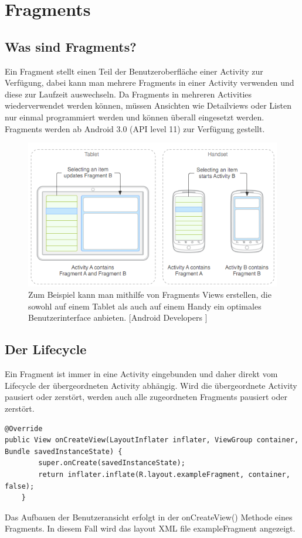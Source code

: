 \documentclass[FIPLY_base.tex]{subfiles}
\author{Andreas Denkmayr}
\date{20. Dezember 2015}
\begin{document}
\section{Fragments}
\subsection{Was sind Fragments?}
Ein Fragment stellt einen Teil der Benutzeroberfläche einer Activity zur Verfügung, dabei kann man mehrere Fragments in einer Activity verwenden und diese zur Laufzeit auswechseln.
Da Fragments in mehreren Activities wiederverwendet werden können, müssen Ansichten wie Detailviews oder Listen nur einmal programmiert werden und können überall eingesetzt werden.
Fragments werden ab Android 3.0 (API level 11) zur Verfügung gestellt. 

\begin{figure}[h]
\includegraphics[scale=0.60]{img/fragments_modules}
\caption{Zum Beispiel kann man mithilfe von Fragments Views erstellen, die sowohl auf einem Tablet als auch auf einem Handy ein optimales Benutzerinterface anbieten. 
[Android Developers \cite{adFragmentsGuide}]}
\end{figure}

\newpage
\subsection{Der Lifecycle}
Ein Fragment ist immer in eine Activity eingebunden und daher direkt vom Lifecycle der übergeordneten Activity abhängig.
Wird die übergeordnete Activity pausiert oder zerstört, werden auch alle zugeordneten Fragments pausiert oder zerstört. %
\ \\
\begin{lstlisting}
@Override
public View onCreateView(LayoutInflater inflater, ViewGroup container, Bundle savedInstanceState) {
        super.onCreate(savedInstanceState);
        return inflater.inflate(R.layout.exampleFragment, container, false);
    }
\end{lstlisting}
Das Aufbauen der Benutzeransicht erfolgt in der onCreateView() Methode eines Fragments. In diesem Fall wird das layout XML file exampleFragment angezeigt.
\end{document}
